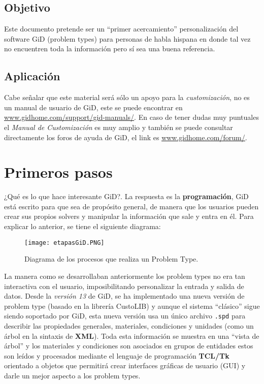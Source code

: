 \documentclass[10pt, a4paper, twocolumn]{article} %
\begin{document}
\subsection{Objetivo}

Este documento pretende ser un ``primer acercamiento'' personalización del software GiD (problem types) para personas de habla hispana en donde tal vez no encuentren toda la información pero sí sea una buena referencia.

\subsection{Aplicación}

Cabe señalar que este material será sólo un apoyo para la \textit{customización}, no es un manual de usuario de GiD, este se puede encontrar en \textcolor{BlueGiD}{\underline{\url{www.gidhome.com/support/gid-manuals/}}}. En caso de tener dudas muy puntuales el \textit{Manual de Customización} es muy amplio y también se puede consultar directamente los foros de ayuda de GiD, el link es \textcolor{BlueGiD}{\underline{\url{www.gidhome.com/forum/}}}.

\section{Primeros pasos} \label{sec:manualTCL}

¿Qué es lo que hace interesante GiD?. La respuesta es la \textbf{programación}, GiD está escrito para que sea de propósito general, de manera que los usuarios pueden crear sus propios solvers y manipular la información que sale y entra en él. Para explicar lo anterior, se tiene el siguiente diagrama:

\begin{figure}[hbt!]\label{fig:diagramaProcesos} \centering
	\texttt{[image: etapasGiD.PNG]}
	\caption{Diagrama de los procesos que realiza un Problem Type.}
\end{figure}

La manera como se desarrollaban anteriormente los problem types no era tan interactiva con el usuario, imposibilitando personalizar la entrada y salida de datos. Desde la \textit{versión 13} de GiD, se ha implementado una nueva versión de problem type (basado en la librería CustoLIB) y aunque el sistema ``clásico'' sigue siendo soportado por GiD, esta nueva versión usa un único archivo \texttt{.spd} para describir las propiedades generales, materiales, condiciones y unidades (como un árbol en la sintaxis de \textbf{XML}). Toda esta información se muestra en una ``vista de árbol'' y los materiales y condiciones son asociados en grupos de entidades estos son leídos y procesados mediante el lenguaje de programación \textbf{TCL/Tk} orientado a objetos que permitirá crear interfaces gráficas de usuario (GUI) y darle un mejor aspecto a los problem types.
\end{document}
